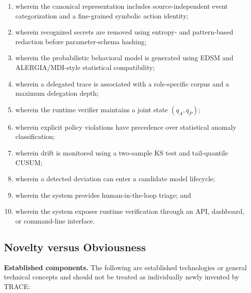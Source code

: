 \documentclass[11pt,a4paper]{article}
\begin{document}
\begin{enumerate}[leftmargin=1.6em, label=(\alph*)]

\item wherein the canonical representation includes source-independent event
categorization and a fine-grained symbolic action identity;

\item wherein recognized secrets are removed using entropy- and pattern-based redaction
before parameter-schema hashing;

\item wherein the probabilistic behavioral model is generated using EDSM and
ALERGIA/MDI-style statistical compatibility;

\item wherein a delegated trace is associated with a role-specific corpus and a maximum
delegation depth;

\item wherein the runtime verifier maintains a joint state
$(q_A,q_P)$;

\item wherein explicit policy violations have precedence over statistical anomaly
classification;

\item wherein drift is monitored using a two-sample KS test and tail-quantile CUSUM;

\item wherein a detected deviation can enter a candidate model lifecycle;

\item wherein the system provides human-in-the-loop triage; and

\item wherein the system exposes runtime verification through an API, dashboard, or
command-line interface.

\end{enumerate}

\subsection{Novelty versus Obviousness}

\textbf{Established components.}
The following are established technologies or general technical concepts and should not
be treated as individually newly invented by TRACE:
\end{document}
